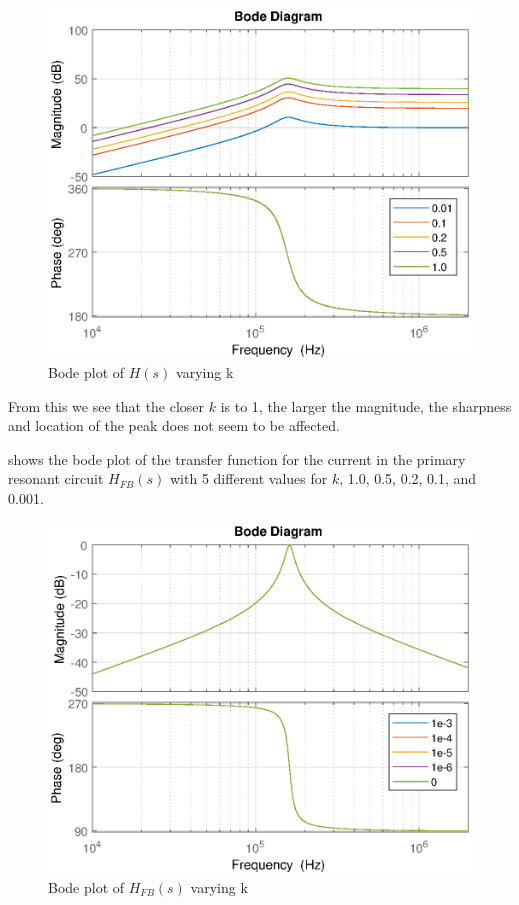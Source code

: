 \begin{figure}[H]
    \centering
    \includegraphics[width=\textwidth]{img/CoilRigBode_k.eps}
    \caption{Bode plot of $H(s)$ varying k}
    \label{fig:bode_k}
\end{figure}

From this we see that the closer $k$ is to 1, the larger the magnitude, the sharpness and location of the peak does not seem to be affected.

 shows the bode plot of the transfer function for the current in the primary resonant circuit $H_{FB}(s)$ with 5 different values for $k$, 1.0, 0.5, 0.2, 0.1, and 0.001.
\begin{figure}[H]
    \centering
    \includegraphics[width=\textwidth]{img/FeedBackBode_k.eps}
    \caption{Bode plot of $H_{FB}(s)$ varying k}
    \label{fig:fbbode_k}
\end{figure}

